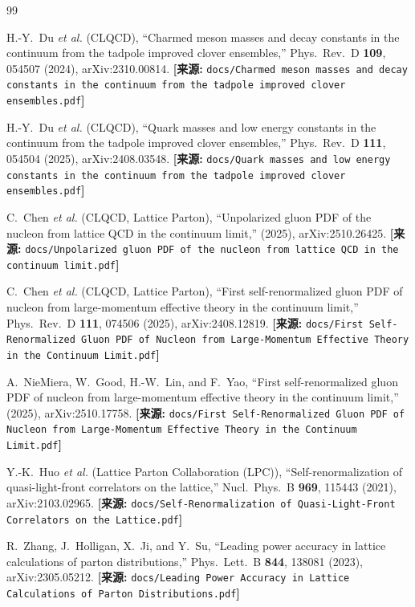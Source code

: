 \documentclass[12pt,a4paper]{ctexart}
\theoremstyle{definition}
\begin{document}
\begin{thebibliography}{99}

H.-Y.~Du \textit{et al.} (CLQCD),
``Charmed meson masses and decay constants in the continuum from the tadpole improved clover ensembles,''
Phys.\ Rev.\ D \textbf{109}, 054507 (2024), arXiv:2310.00814.
\quad\textbf{[来源:} \texttt{docs/Charmed meson masses and decay constants in the continuum from the tadpole improved clover ensembles.pdf}\textbf{]}

H.-Y.~Du \textit{et al.} (CLQCD),
``Quark masses and low energy constants in the continuum from the tadpole improved clover ensembles,''
Phys.\ Rev.\ D \textbf{111}, 054504 (2025), arXiv:2408.03548.
\quad\textbf{[来源:} \texttt{docs/Quark masses and low energy constants in the continuum from the tadpole improved clover ensembles.pdf}\textbf{]}

C.~Chen \textit{et al.} (CLQCD, Lattice Parton),
``Unpolarized gluon PDF of the nucleon from lattice QCD in the continuum limit,''
(2025), arXiv:2510.26425.
\quad\textbf{[来源:} \texttt{docs/Unpolarized gluon PDF of the nucleon from lattice QCD in the continuum limit.pdf}\textbf{]}

C.~Chen \textit{et al.} (CLQCD, Lattice Parton),
``First self-renormalized gluon PDF of nucleon from large-momentum effective theory in the continuum limit,''
Phys.\ Rev.\ D \textbf{111}, 074506 (2025), arXiv:2408.12819.
\quad\textbf{[来源:} \texttt{docs/First Self-Renormalized Gluon PDF of Nucleon from Large-Momentum Effective Theory in the Continuum Limit.pdf}\textbf{]}

A.~NieMiera, W.~Good, H.-W.~Lin, and F.~Yao,
``First self-renormalized gluon PDF of nucleon from large-momentum effective theory in the continuum limit,''
(2025), arXiv:2510.17758.
\quad\textbf{[来源:} \texttt{docs/First Self-Renormalized Gluon PDF of Nucleon from Large-Momentum Effective Theory in the Continuum Limit.pdf}\textbf{]}

Y.-K.~Huo \textit{et al.} (Lattice Parton Collaboration (LPC)),
``Self-renormalization of quasi-light-front correlators on the lattice,''
Nucl.\ Phys.\ B \textbf{969}, 115443 (2021), arXiv:2103.02965.
\quad\textbf{[来源:} \texttt{docs/Self-Renormalization of Quasi-Light-Front Correlators on the Lattice.pdf}\textbf{]}

R.~Zhang, J.~Holligan, X.~Ji, and Y.~Su,
``Leading power accuracy in lattice calculations of parton distributions,''
Phys.\ Lett.\ B \textbf{844}, 138081 (2023), arXiv:2305.05212.
\quad\textbf{[来源:} \texttt{docs/Leading Power Accuracy in Lattice Calculations of Parton Distributions.pdf}\textbf{]}


\end{thebibliography}
\end{document}
